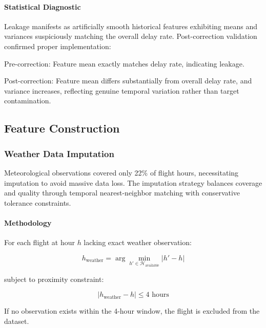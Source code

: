 \documentclass{report}
\begin{document}
\paragraph{Statistical Diagnostic}

Leakage manifests as artificially smooth historical features exhibiting means and variances suspiciously matching the overall delay rate. Post-correction validation confirmed proper implementation:

Pre-correction: Feature mean exactly matches delay rate, indicating leakage.

Post-correction: Feature mean differs substantially from overall delay rate, and variance increases, reflecting genuine temporal variation rather than target contamination.

\subsection{Feature Construction}
\label{sec:feature_construction}

\subsubsection{Weather Data Imputation}
\label{sec:weather_imputation}

Meteorological observations covered only 22\% of flight hours, necessitating imputation to avoid massive data loss. The imputation strategy balances coverage and quality through temporal nearest-neighbor matching with conservative tolerance constraints.

\paragraph{Methodology}

For each flight at hour $h$ lacking exact weather observation:

\begin{equation}
h_{\text{weather}} = \arg\min_{h' \in \mathcal{H}_{\text{available}}} |h' - h|
\end{equation}

subject to proximity constraint:

\begin{equation}
|h_{\text{weather}} - h| \leq 4 \text{ hours}
\end{equation}

If no observation exists within the 4-hour window, the flight is excluded from the dataset.
\end{document}

